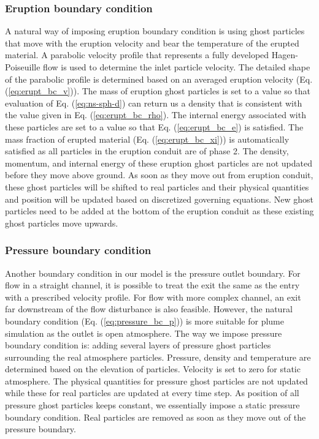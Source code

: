 \documentclass[gmd, manuscript]{copernicus}
\begin{document}
\subsubsection{Eruption boundary condition}
A natural way of imposing eruption boundary condition is using ghost particles that move with the eruption velocity and bear the temperature of the erupted material. A parabolic velocity profile that represents a fully developed Hagen-Poiseuille flow is used to determine the inlet particle velocity. The detailed shape of the parabolic profile is determined based on an averaged eruption velocity (Eq. (\ref{eq:erupt_bc_v})). The mass of eruption ghost particles is set to a value so that evaluation of Eq. (\ref{eq:ns-sph-d}) can return us a density that is consistent with the value given in Eq. (\ref{eq:erupt_bc_rho}). 
The internal energy associated with these particles are set to a value so that Eq. (\ref{eq:erupt_bc_e}) is satisfied. The mass fraction of erupted material (Eq. (\ref{eq:erupt_bc_xi})) is automatically satisfied as all particles in the eruption conduit are of phase 2. The density, momentum, and internal energy of these eruption ghost particles are not updated before they move above ground. As soon as they move out from eruption conduit, these ghost particles will be shifted to real particles and their physical quantities and position will be updated based on discretized governing equations. New ghost particles need to be added at the bottom of the eruption conduit as these existing ghost particles move upwards.

\subsubsection{Pressure boundary condition}
Another boundary condition in our model is the pressure outlet boundary. For flow in a straight channel, it is possible to treat the exit the same as the entry with a prescribed velocity profile. For flow with more complex channel, an exit far downstream of the flow disturbance is also feasible. However, the natural boundary condition (Eq. (\ref{eq:pressure_bc_p})) is more suitable for plume simulation as the outlet is open atmosphere. The way we impose pressure boundary condition is: adding several layers of pressure ghost particles surrounding the real atmosphere particles. Pressure, density and temperature are determined based on the elevation of particles. Velocity is set to zero for static atmosphere. The physical quantities for pressure ghost particles are not updated while these for real particles are updated at every time step. As position of all pressure ghost particles keeps constant, we essentially impose a static pressure boundary condition. Real particles are removed as soon as they move out of the pressure boundary.
\end{document}
